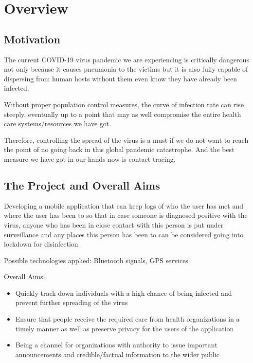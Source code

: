 \section{Overview}
  \subsection{Motivation}
    \par The current COVID-19 virus pandemic we are experiencing is critically dangerous not only because it causes pneumonia to the victims but it is also fully capable of dispersing from human hosts without them even know they have already been infected.
    \par Without proper population control measures, the curve of infection rate can rise steeply, eventually up to a point that may as well compromise the entire health care systems/resources we have got.
    \par Therefore, controlling the spread of the virus is a must if we do not want to reach the point of no going back in this global pandemic catastrophe. And the best measure we have got in our hands now is contact tracing.
  \subsection{The Project and Overall Aims}
    \par Developing a mobile application that can keep logs of who the user has met and where the user has been to so that in case someone is diagnosed positive with the virus, anyone who has been in close contact with this person is put under surveillance and any places this person has been to can be considered going into lockdown for disinfection.
    \par Possible technologies applied: Bluetooth signals, GPS services
    \par Overall Aims:
    \begin{itemize}
      \item Quickly track down individuals with a high chance of being infected and prevent further spreading of the virus
      \item Ensure that people receive the required care from health organizations in a timely manner as well as preserve privacy for the users of the application
      \item Being a channel for organizations with authority to issue important announcements and credible/factual information to the wider public
    \end{itemize}

